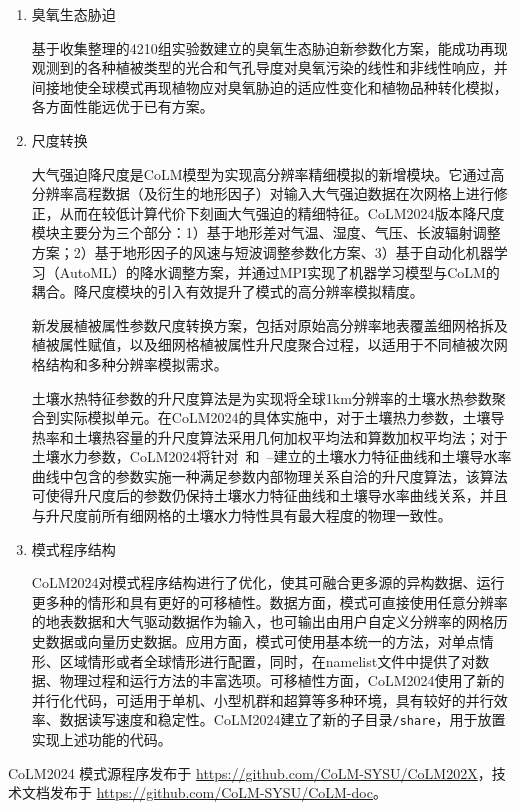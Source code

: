 \begin{enumerate}[label={\arabic*)}]
    \item 臭氧生态胁迫

    基于收集整理的4210组实验数建立的臭氧生态胁迫新参数化方案，能成功再现观测到的各种植被类型的光合和气孔导度对臭氧污染的线性和非线性响应，并间接地使全球模式再现植物应对臭氧胁迫的适应性变化和植物品种转化模拟，各方面性能远优于已有方案。
    
    \item 尺度转换

    大气强迫降尺度是CoLM模型为实现高分辨率精细模拟的新增模块。它通过高分辨率高程数据（及衍生的地形因子）对输入大气强迫数据在次网格上进行修正，从而在较低计算代价下刻画大气强迫的精细特征。CoLM2024版本降尺度模块主要分为三个部分：1）基于地形差对气温、湿度、气压、长波辐射调整方案；2）基于地形因子的风速与短波调整参数化方案、3）基于自动化机器学习（AutoML）的降水调整方案，并通过MPI实现了机器学习模型与CoLM的耦合。降尺度模块的引入有效提升了模式的高分辨率模拟精度。

    新发展植被属性参数尺度转换方案，包括对原始高分辨率地表覆盖细网格拆及植被属性赋值，以及细网格植被属性升尺度聚合过程，以适用于不同植被次网格结构和多种分辨率模拟需求。

    土壤水热特征参数的升尺度算法是为实现将全球1km分辨率的土壤水热参数聚合到实际模拟单元。在CoLM2024的具体实施中，对于土壤热力参数，土壤导热率和土壤热容量的升尺度算法采用几何加权平均法和算数加权平均法；对于土壤水力参数，CoLM2024将针对~\citet{campbell1974}和~\citet{van1980closed}–\citet{mualem1976new}建立的土壤水力特征曲线和土壤导水率曲线中包含的参数实施一种满足参数内部物理关系自洽的升尺度算法，该算法可使得升尺度后的参数仍保持土壤水力特征曲线和土壤导水率曲线关系，并且与升尺度前所有细网格的土壤水力特性具有最大程度的物理一致性。
    
    \item 模式程序结构
    
    CoLM2024对模式程序结构进行了优化，使其可融合更多源的异构数据、运行更多种的情形和具有更好的可移植性。数据方面，模式可直接使用任意分辨率的地表数据和大气驱动数据作为输入，也可输出由用户自定义分辨率的网格历史数据或向量历史数据。应用方面，模式可使用基本统一的方法，对单点情形、区域情形或者全球情形进行配置，同时，在namelist文件中提供了对数据、物理过程和运行方法的丰富选项。可移植性方面，CoLM2024使用了新的并行化代码，可适用于单机、小型机群和超算等多种环境，具有较好的并行效率、数据读写速度和稳定性。CoLM2024建立了新的子目录\texttt{/share}，用于放置实现上述功能的代码。
    
\end{enumerate}

CoLM2024 模式源程序发布于 \url{https://github.com/CoLM-SYSU/CoLM202X}，技术文档发布于 \url{https://github.com/CoLM-SYSU/CoLM-doc}。
